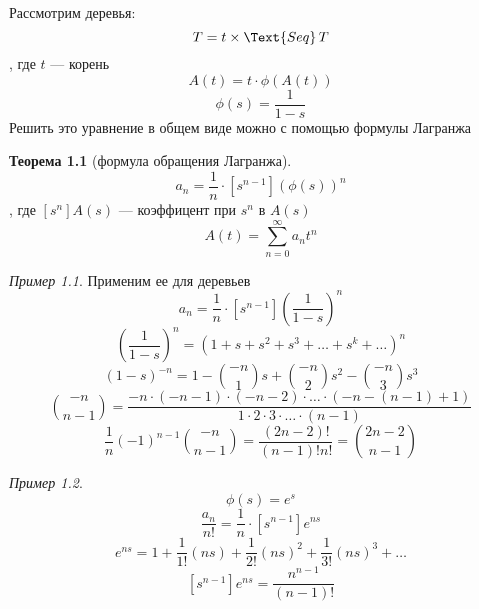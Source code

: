 \documentclass[oneside]{book}
\theoremstyle{plain}
\theoremstyle{remark}
\newtheorem*{examp}{Пример}
\theoremstyle{definition}
\newtheorem{theorem}{Теорема}[section]
\begin{document}
\chapter{}
\label{sec:orgb2c435a}
\newcommand{\stirlF}[2]{\left[\begin{matrix} #1 \\ #2 \end{matrix}\right]}
\newcommand{\stirlS}[2]{\left\{\begin{matrix} #1 \\ #2 \end{matrix}\right\}}
\newcommand{\Set}{\text{Set}\,}
\newcommand{\Seq}{\text{Seq}\,}
\newcommand{\Cyc}{\text{Cyc}\,}


Рассмотрим деревья:
\[ T = t \times \Text{Seq}\,T \]
, где \(t\) --- корень
\[ A(t) = t\cdot \phi(A(t)) \]
\[ \phi(s) = \frac{1}{1 - s} \]
Решить это уравнение в общем виде можно с помощью формулы Лагранжа
\begin{theorem}[формула обращения Лагранжа]
\[ a_n = \frac{1}{n}\cdot[s^{n - 1}](\phi(s))^n \], где \([s^{n}]A(s)\) --- коэффицент при \(s^n\) в \(A(s)\)
\[ A(t) = \sum_{n = 0}^\infty a_n t^n \]
\end{theorem}
\begin{examp}
Применим ее для деревьев
\[ a_n = \frac{1}{n}\cdot[s^{n - 1}]\left(\frac{1}{1 - s}\right)^n \]
\[ \left(\frac{1}{1 - s}\right)^n = (1 + s + s^2 + s^3 + \dots + s^k + \dots)^n \]
\[ (1 - s)^{-n} = 1 - \binom{-n}{1} s + \binom{-n}{2}s^2 - \binom{-n}{3}s^3 \]
\[ \binom{-n}{n - 1} = \frac{-n\cdot(-n - 1)\cdot(-n - 2)\cdot\dots\cdot(-n - (n - 1) + 1)}{1\cdot 2 \cdot 3 \cdot \dots \cdot (n - 1)} \]
\[ \frac{1}{n}(-1)^{n - 1}\binom{-n}{n - 1} = \frac{(2n - 2)!}{(n - 1)!n!} = \binom{2n - 2}{n - 1} \]
\end{examp}
\begin{examp}
\[ \phi(s) = e^s \]
\[ \frac{a_n}{n!} = \frac{1}{n}\cdot[s^{n- 1}] e^{ns} \]
\[ e^{ns} = 1 + \frac{1}{1!}(ns) + \frac{1}{2!}(ns)^2 + \frac{1}{3!}(ns)^3 + \dots \]
\[ [s^{n - 1}]e^{ns} = \frac{n^{n - 1}}{(n - 1)!} \]
\end{examp}
\end{document}
